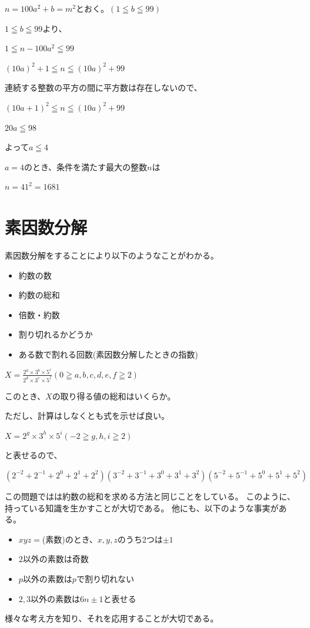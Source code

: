 \documentclass[uplatex,dvipdfmx]{jsbook}
\begin{document}
\begin{answer}[別解]
    $n=100a^2+b=m^2$とおく。$\left(1\leqq b \leqq 99\right)$

    $1\leqq b \leqq 99$より、

    $1\leqq n-100a^2 \leqq 99$

    $\left(10a\right)^2+1 \leqq n \leqq \left(10a\right)^2+99$

    連続する整数の平方の間に平方数は存在しないので、

    $\left(10a+1\right)^2 \leqq n \leqq \left(10a\right)^2+99$

    $20a \leqq 98$

    よって$a\leqq 4$

    $a=4$のとき、条件を満たす最大の整数$n$は

    $n=41^2=1681$
\end{answer}

\section{素因数分解}
素因数分解をすることにより以下のようなことがわかる。
\begin{itemize}
    \item 約数の数
    \item 約数の総和
    \item 倍数・約数
    \item 割り切れるかどうか
    \item ある数で割れる回数(素因数分解したときの指数)
\end{itemize}

\begin{problem}
    $\displaystyle X=\frac{2^a\times 3^b \times 5^c}{2^d\times 3^e \times 5^f}\left(0\geqq a,b,c,d,e,f\geqq 2\right)$

    このとき、$X$の取り得る値の総和はいくらか。

    ただし、計算はしなくとも式を示せば良い。
\end{problem}

\begin{answer}
    $\displaystyle X=2^g\times 3^h \times 5^i\left(-2\geqq g,h,i\geqq 2\right)$

    と表せるので、

    $\left(2^{-2}+2^{-1}+2^{0}+2^{1}+2^{2}\right)\left(3^{-2}+3^{-1}+3^{0}+3^{1}+3^{2}\right)\left(5^{-2}+5^{-1}+5^{0}+5^{1}+5^{2}\right)$
\end{answer}

この問題ではは約数の総和を求める方法と同じことをしている。
このように、持っている知識を生かすことが大切である。
他にも、以下のような事実がある。
\begin{itemize}
    \item $xyz=$(素数)のとき、$x,y,z$のうち2つは$\pm 1$
    \item $2$以外の素数は奇数
    \item $p$以外の素数は$p$で割り切れない
    \item $2,3$以外の素数は$6n\pm 1$と表せる
\end{itemize}
様々な考え方を知り、それを応用することが大切である。
\end{document}
